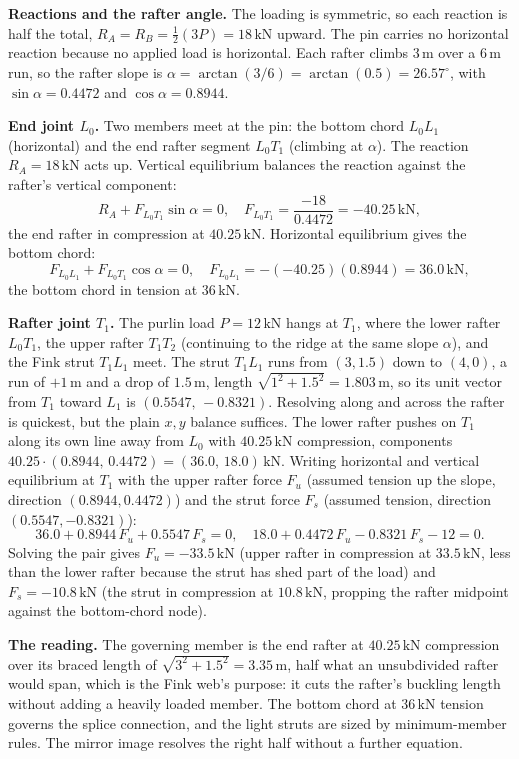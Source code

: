 \textbf{Reactions and the rafter angle.} The loading is symmetric, so each
reaction is half the total, $R_A = R_B = \tfrac12(3P) = 18\,\text{kN}$ upward.
The pin carries no horizontal reaction because no applied load is horizontal.
Each rafter climbs $3\,\si{\meter}$ over a $6\,\si{\meter}$ run, so the rafter
slope is $\alpha = \arctan(3/6) = \arctan(0.5) = 26.57^{\circ}$, with
$\sin\alpha = 0.4472$ and $\cos\alpha = 0.8944$.

\textbf{End joint $L_0$.} Two members meet at the pin: the bottom chord
$L_0L_1$ (horizontal) and the end rafter segment $L_0T_1$ (climbing at
$\alpha$). The reaction $R_A = 18\,\text{kN}$ acts up. Vertical equilibrium
balances the reaction against the rafter's vertical component:
\[
R_A + F_{L_0T_1}\sin\alpha = 0, \quad
F_{L_0T_1} = \frac{-18}{0.4472} = -40.25\,\text{kN},
\]
the end rafter in compression at $40.25\,\text{kN}$. Horizontal equilibrium
gives the bottom chord:
\[
F_{L_0L_1} + F_{L_0T_1}\cos\alpha = 0, \quad
F_{L_0L_1} = -(-40.25)(0.8944) = 36.0\,\text{kN},
\]
the bottom chord in tension at $36\,\text{kN}$.

\textbf{Rafter joint $T_1$.} The purlin load $P = 12\,\text{kN}$ hangs at
$T_1$, where the lower rafter $L_0T_1$, the upper rafter $T_1T_2$ (continuing
to the ridge at the same slope $\alpha$), and the Fink strut $T_1L_1$ meet.
The strut $T_1L_1$ runs from $(3, 1.5)$ down to $(4, 0)$, a run of
$+1\,\si{\meter}$ and a drop of $1.5\,\si{\meter}$, length
$\sqrt{1^2 + 1.5^2} = 1.803\,\si{\meter}$, so its unit vector from $T_1$
toward $L_1$ is $(0.5547,\,-0.8321)$. Resolving along and across the rafter is
quickest, but the plain $x,y$ balance suffices. The lower rafter pushes on
$T_1$ along its own line away from $L_0$ with $40.25\,\text{kN}$ compression,
components $40.25 \cdot (0.8944,\,0.4472) = (36.0,\,18.0)\,\text{kN}$.
Writing horizontal and vertical equilibrium at $T_1$ with the upper rafter
force $F_u$ (assumed tension up the slope, direction $(0.8944, 0.4472)$) and
the strut force $F_s$ (assumed tension, direction $(0.5547, -0.8321)$):
\[
36.0 + 0.8944\,F_u + 0.5547\,F_s = 0, \quad
18.0 + 0.4472\,F_u - 0.8321\,F_s - 12 = 0.
\]
Solving the pair gives $F_u = -33.5\,\text{kN}$ (upper rafter in compression
at $33.5\,\text{kN}$, less than the lower rafter because the strut has shed
part of the load) and $F_s = -10.8\,\text{kN}$ (the strut in compression at
$10.8\,\text{kN}$, propping the rafter midpoint against the bottom-chord node).

\textbf{The reading.} The governing member is the end rafter at
$40.25\,\text{kN}$ compression over its braced length of
$\sqrt{3^2 + 1.5^2} = 3.35\,\si{\meter}$, half what an unsubdivided rafter
would span, which is the Fink web's purpose: it cuts the rafter's buckling
length without adding a heavily loaded member. The bottom chord at
$36\,\text{kN}$ tension governs the splice connection, and the light struts
are sized by minimum-member rules. The mirror image resolves the right half
without a further equation.

